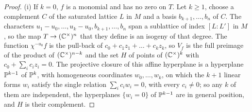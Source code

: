 \begin{proof}
(i) If $k=0$, $f$ is a monomial and has no zero on $T$. Let $k\ge1$, choose a
complement $C$ of the saturated lattice $L$ in $M$ and a basis
$b_{k+1},\dots,b_{n}$ of $C$. The characters $u_{1}-u_{0},\dots,u_{k}-u_{0},
b_{k+1},\dots,b_{n}$ span a sublattice of index $[L:L']$ in $M$, so the map
$T\to(\mathbb{C}^{\times})^{n}$ that they define is an isogeny of that degree. The
function $\chi^{-u_{0}}f$ is the pull-back of $c_{0}+c_{1}z_{1}+\dots+c_{k}
z_{k}$, so $V_{f}$ is the full preimage of the product of
$(\mathbb{C}^{\times})^{n-k}$ and the set $H$ of points of $(\mathbb{C}^{\times})^{k}$ with
$c_{0}+\sum_{i}c_{i}z_{i}=0$. The projective closure of this affine hyperplane is a hyperplane
$\mathbb{P}^{k-1}$ of $\mathbb{P}^{k}$, with homogeneous coordinates $w_{0},\dots,w_{k}$,
on which the $k+1$ linear forms $w_{i}$ satisfy the single relation
$\sum_{i}c_{i}w_{i}=0$, with every $c_{i}\ne0$; so any $k$ of them are
independent, the hyperplanes $\{w_{i}=0\}$ of $\mathbb{P}^{k-1}$ are in general
position, and $H$ is their complement.


\end{proof}
